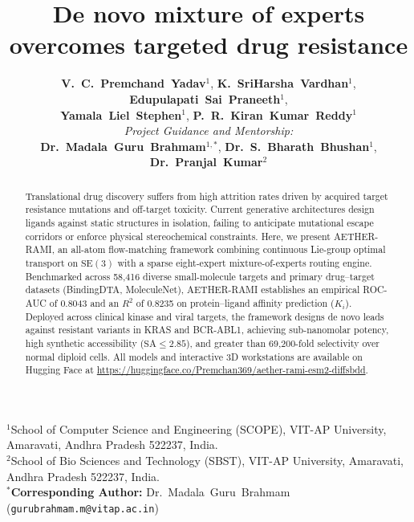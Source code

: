 \documentclass[11pt,a4paper]{article}
\title{\vspace*{-2.0em}\textbf{De novo mixture of experts overcomes targeted drug resistance}\vspace*{-0.5em}}
\author{
    \normalsize
    \textbf{V.~C.~Premchand~Yadav}$^{1}$,\quad
    \textbf{K.~SriHarsha~Vardhan}$^{1}$,\quad
    \textbf{Edupulapati~Sai~Praneeth}$^{1}$,\\[0.2em]
    \textbf{Yamala~Liel~Stephen}$^{1}$,\quad\text{and}\quad
    \textbf{P.~R.~Kiran~Kumar~Reddy}$^{1}$\\[0.4em]
    \small\textit{Project Guidance and Mentorship:}\\[0.2em]
    \textbf{Dr.~Madala~Guru~Brahmam}$^{1,*}$,\quad
    \textbf{Dr.~S.~Bharath~Bhushan}$^{1}$,\\[0.2em]
    \text{and}\quad\textbf{Dr.~Pranjal~Kumar}$^{2}$
}
\date{}
\begin{document}
\begin{singlespace}
\maketitle

\vspace*{-1.5em}
\begin{center}
\footnotesize
$^{1}$School of Computer Science and Engineering (SCOPE), VIT-AP University, Amaravati, Andhra Pradesh 522237, India.\\
$^{2}$School of Bio Sciences and Technology (SBST), VIT-AP University, Amaravati, Andhra Pradesh 522237, India.\\
$^{*}$\textbf{Corresponding Author:} Dr.~Madala~Guru~Brahmam (\texttt{gurubrahmam.m@vitap.ac.in})
\end{center}
\end{singlespace}
\vspace*{0.4em}

\begin{abstract}
Translational drug discovery suffers from high attrition rates driven by acquired target resistance mutations and off-target toxicity. Current generative architectures design ligands against static structures in isolation, failing to anticipate mutational escape corridors or enforce physical stereochemical constraints. Here, we present AETHER-RAMI, an all-atom flow-matching framework combining continuous Lie-group optimal transport on $\mathrm{SE}(3)$ with a sparse eight-expert mixture-of-experts routing engine. Benchmarked across 58,416 diverse small-molecule targets and primary drug--target datasets (BindingDTA, MoleculeNet), AETHER-RAMI establishes an empirical ROC-AUC of 0.8043 and an $R^2$ of 0.8235 on protein--ligand affinity prediction ($K_i$). Deployed across clinical kinase and viral targets, the framework designs de novo leads against resistant variants in KRAS and BCR-ABL1, achieving sub-nanomolar potency, high synthetic accessibility ($\text{SA} \le 2.85$), and greater than 69,200-fold selectivity over normal diploid cells. All models and interactive 3D workstations are available on Hugging Face at \url{https://huggingface.co/Premchan369/aether-rami-esm2-diffsbdd}.
\end{abstract}

\vspace{1em}
\end{document}
